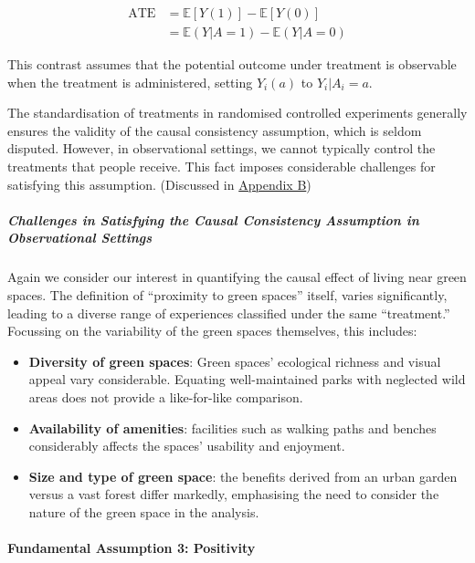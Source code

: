 \documentclass[
  singlecolumn]{article}
\let\oldparagraph\paragraph
\renewcommand{\paragraph}[1]{\oldparagraph{#1}\mbox{}}
\let\oldsubparagraph\subparagraph
\renewcommand{\subparagraph}[1]{\oldsubparagraph{#1}\mbox{}}
\providecommand{\tightlist}{%
  \setlength{\itemsep}{0pt}\setlength{\parskip}{0pt}}\usepackage{longtable,booktabs,array}
\begin{document}
\[
\begin{aligned}
\text{ATE} &= \mathbb{E}[Y(1)] - \mathbb{E}[Y(0)] \\
&= \mathbb{E}(Y|A=1) - \mathbb{E}(Y|A=0)
\end{aligned}
\]

This contrast assumes that the potential outcome under treatment is
observable when the treatment is administered, setting \(Y_i(a)\) to
\(Y_i|A_i=a\).

The standardisation of treatments in randomised controlled experiments
generally ensures the validity of the causal consistency assumption,
which is seldom disputed. However, in observational settings, we cannot
typically control the treatments that people receive. This fact imposes
considerable challenges for satisfying this assumption. (Discussed in
\hyperref[appendix-b]{Appendix B})

\subparagraph{Challenges in Satisfying the Causal Consistency Assumption
in Observational
Settings}\label{challenges-in-satisfying-the-causal-consistency-assumption-in-observational-settings}

Again we consider our interest in quantifying the causal effect of
living near green spaces. The definition of ``proximity to green
spaces'' itself, varies significantly, leading to a diverse range of
experiences classified under the same ``treatment.'' Focussing on the
variability of the green spaces themselves, this includes:

\begin{itemize}
\tightlist
\item
  \textbf{Diversity of green spaces}: Green spaces' ecological richness
  and visual appeal vary considerable. Equating well-maintained parks
  with neglected wild areas does not provide a like-for-like comparison.
\item
  \textbf{Availability of amenities}: facilities such as walking paths
  and benches considerably affects the spaces' usability and enjoyment.
\item
  \textbf{Size and type of green space}: the benefits derived from an
  urban garden versus a vast forest differ markedly, emphasising the
  need to consider the nature of the green space in the analysis.
\end{itemize}

\paragraph{Fundamental Assumption 3:
Positivity}\label{fundamental-assumption-3-positivity}
\end{document}
